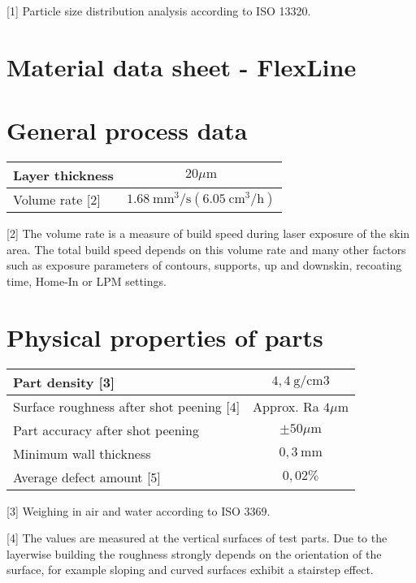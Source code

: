 \documentclass[10pt]{article}
\begin{document}
[1] Particle size distribution analysis according to ISO 13320.

\section*{Material data sheet - FlexLine}
\section*{General process data}
\begin{center}
\begin{tabular}{lc}
\hline
Layer thickness & $20 \mu \mathrm{m}$ \\
\hline
Volume rate [2] & $1.68 \mathrm{~mm}^{3} / \mathrm{s}\left(6.05 \mathrm{~cm}^{3} / \mathrm{h}\right)$ \\
\hline
\end{tabular}
\end{center}

[2] The volume rate is a measure of build speed during laser exposure of the skin area. The total build speed depends on this volume rate and many other factors such as exposure parameters of contours, supports, up and downskin, recoating time, Home-In or LPM settings.

\section*{Physical properties of parts}
\begin{center}
\begin{tabular}{lc}
\hline
Part density [3] & $4,4 \mathrm{~g} / \mathrm{cm} 3$ \\
\hline
Surface roughness after shot peening [4] & Approx. Ra $4 \mu \mathrm{m}$ \\
\hline
Part accuracy after shot peening & $\pm 50 \mu \mathrm{m}$ \\
\hline
Minimum wall thickness & $0,3 \mathrm{~mm}$ \\
\hline
Average defect amount [5] & $0,02 \%$ \\
\hline
\end{tabular}
\end{center}

[3] Weighing in air and water according to ISO 3369.

[4] The values are measured at the vertical surfaces of test parts. Due to the layerwise building the roughness strongly depends on the orientation of the surface, for example sloping and curved surfaces exhibit a stairstep effect.
\end{document}
